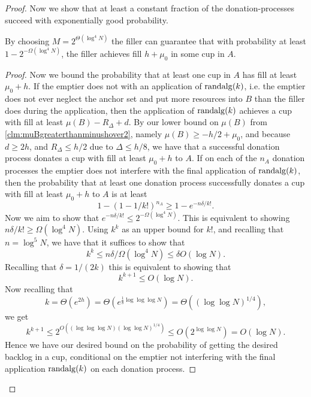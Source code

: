 \begin{proof}
Now we show that at least a constant fraction of the
donation-processes succeed with exponentially good probability.
\begin{clm}
  \label{clm:baseChernoffBound}
  By choosing $M = 2^{\Theta(\log^4 N)}$ the filler can guarantee that with
  probability at least $1-2^{-\Omega(\log^4 N)}$, the filler achieves
  fill $h+\mu_0$ in some cup in $A$. 
\end{clm}
\begin{proof}
Now we bound the probability that at least one cup in $A$ has
fill at least $\mu_0 + h$. If the emptier does not
 with an application of $\operatorname{\text{\textup{randalg}}}(k)$, i.e. the
emptier does not ever neglect the anchor set and put more resources
into $B$ than the filler does during the application, then the
application of $\operatorname{\text{\textup{randalg}}}(k)$ achieves a cup with fill at least
$\mu(B) - R_\Delta + d$. By our lower bound
on $\mu(B)$ from \cref{clm:muBgreaterthanminushover2}, namely
$\mu(B) \ge -h/2 + \mu_0$, and because $d\ge 2h$, and $R_\Delta
\le h/2$ due to $\Delta \le h/8$, we have that a successful
donation process donates a cup with fill at least $\mu_0 + h$ to
$A$. If on each of the $n_A$ donation processes the emptier does
not interfere with the final application of $\operatorname{\text{\textup{randalg}}}(k)$, then 
the probability that at least one donation process successfully
donates a cup with fill at least $\mu_0 + h$ to $A$ is at least 
$$1-(1-1/k!)^{n_A} \ge 1-e^{- n\delta/k!}.$$
Now we aim to show that $e^{-n \delta/k!} \le 2^{-\Omega(\log^4 N)}$.
This is equivalent to showing $n\delta/k! \ge \Omega(\log^4 N)$.
Using $k^k$ as an upper bound for $k!$, and recalling that
$n=\log^5 N$, we have that it suffices to show that 
$$k^k \le n\delta / \Omega(\log^4 N) \le \delta O(\log N).$$
Recalling that $\delta = 1/(2k)$ this is equivalent to showing
that
$$k^{k+1} \le O(\log N).$$
Now recalling that 
$$k = \Theta(e^{2h}) = \Theta(e^{\frac{1}{8}\log\log\log N}) =
\Theta((\log\log N)^{1/4}),$$ 
we get 
$$k^{k+1} \le 2^{O((\log\log\log N)(\log\log N)^{1/4})} \le
O(2^{\log\log N}) = O(\log N).$$
Hence we have our desired bound on the probability of getting the
desired backlog in a cup, conditional on the emptier not
interfering with the final application $\operatorname{\text{\textup{randalg}}}(k)$ on each
donation process.


\end{proof}
\end{proof}
